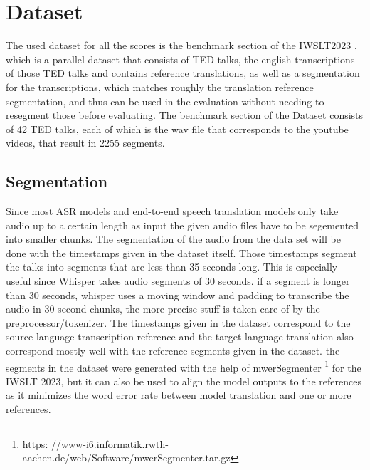 \section{Dataset}
\label{ch:Dataset}
The used dataset for all the scores is the benchmark section of the IWSLT2023 \cite{sperber2024evaluating}, which is a parallel dataset that consists of TED talks, the english transcriptions of those TED talks and contains reference translations, as well as a segmentation for the transcriptions, which matches roughly the translation reference segmentation, and thus can be used in the evaluation without needing to resegment those before evaluating.
The benchmark section of the Dataset consists of 42 TED talks, each of which is the wav file that corresponds to the youtube videos, that result in 2255 segments. 
\subsection{Segmentation}
\label{sec:FirstContent:Segmentation}
Since most ASR models and end-to-end speech translation models only take audio up to a certain length as input the given audio files have to be segemented into smaller chunks. 
The segmentation of the audio from the data set will be done with the timestamps given in the dataset itself. 
Those timestamps segment the talks into segments that are less than 35 seconds long.
This is especially useful since Whisper takes audio segments of 30 seconds. 
if a segment is longer than 30 seconds, whisper uses a moving window and padding to transcribe the audio in 30 second chunks, the more precise stuff is taken care of by the preprocessor/tokenizer.
The timestamps given in the dataset correspond to the source language transcription reference and the target language translation also correspond mostly well with the reference segments given in the dataset. 
the segments in the dataset were generated with the help of mwerSegmenter \footnote{https:
//www-i6.informatik.rwth-aachen.de/web/Software/mwerSegmenter.tar.gz} for the IWSLT 2023, but it can also be used to align the model outputs to the references as it minimizes the word error rate between model translation and one or more references.

